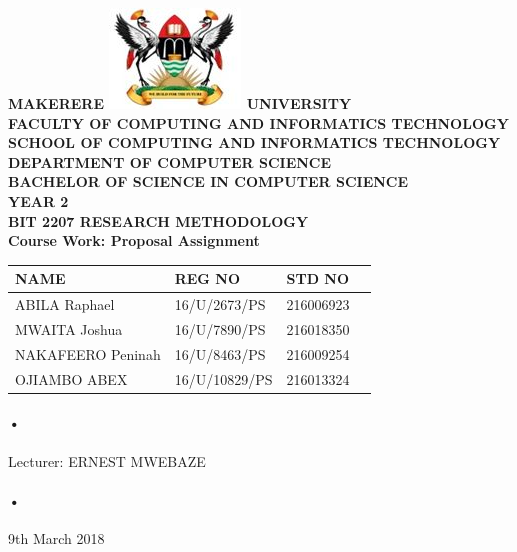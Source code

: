 \documentclass[12pt]{article}
\begin{document}
\begin{Huge}
\begin{center}
\begin{normalsize}
\textbf{MAKERERE \includegraphics[scale=0.5]{logo} UNIVERSITY }\\


\textbf{FACULTY OF COMPUTING AND INFORMATICS TECHNOLOGY} \\
\textbf{SCHOOL OF COMPUTING AND INFORMATICS TECHNOLOGY} \\
\textbf{DEPARTMENT OF COMPUTER SCIENCE} \\
\textbf{BACHELOR OF SCIENCE IN COMPUTER SCIENCE} \\
\textbf{YEAR 2} \\
\textbf{BIT 2207 RESEARCH METHODOLOGY} \\
\textbf{Course Work: Proposal Assignment }\\
\end{normalsize}
\end{center}
\end{Huge}

\begin{center}
\begin{tabular}{|l|l|l|c|}
\hline NAME  & REG NO & STD NO \\\hline

ABILA Raphael& 16/U/2673/PS & 216006923 \\\hline
MWAITA Joshua& 16/U/7890/PS & 216018350 \\\hline
NAKAFEERO Peninah&16/U/8463/PS & 216009254 \\\hline
OJIAMBO ABEX     & 16/U/10829/PS & 216013324 \\\hline
\end{tabular}
\paragraph{•}
Lecturer: ERNEST MWEBAZE \\
\paragraph{•}
9th March 2018

\end{center}
\end{document}
